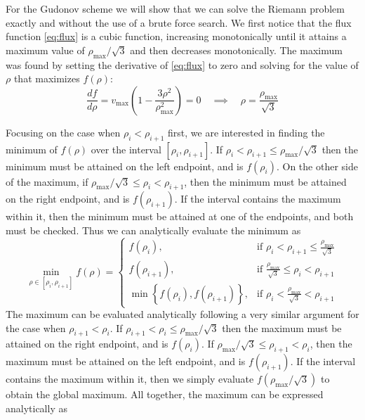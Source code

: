 \documentclass[11pt]{article}
\begin{document}
For the Gudonov scheme we will show that we can solve the Riemann problem exactly and without the use of a brute force search. We first notice that the flux function \eqref{eq:flux} is a cubic function, increasing monotonically until it attains a maximum value of $\rho_\mathrm{max}/\sqrt{3}$ and then decreases monotonically. The maximum was found by setting the derivative of \eqref{eq:flux} to zero and solving for the value of $\rho$ that maximizes $f(\rho)$:
\begin{equation*}
  \frac{df}{d\rho} = v_\mathrm{max} \left( 1 - \frac{3\rho^2}{\rho_\mathrm{max}^2} \right) = 0 \quad \implies \quad \rho = \frac{\rho_\mathrm{max}}{\sqrt{3}}
\end{equation*}

Focusing on the case when $\rho_i < \rho_{i+1}$ first, we are interested in finding the minimum of $f(\rho)$ over the interval $[\rho_i, \rho_{i+1}]$. If $\rho_i < \rho_{i+1} \le \rho_\mathrm{max}/\sqrt{3}$ then the minimum must be attained on the left endpoint, and is $f(\rho_i)$. On the other side of the maximum, if $\rho_\mathrm{max}/\sqrt{3} \le \rho_i < \rho_{i+1}$, then the minimum must be attained on the right endpoint, and is $f(\rho_{i+1})$. If the interval contains the maximum within it, then the minimum must be attained at one of the endpoints, and both must be checked. Thus we can analytically evaluate the minimum as
\begin{equation} \label{eq:min_f}
\min_{\rho \in \left[\rho_i, \rho_{i+1}\right]} f(\rho) =
\begin{cases}
  f(\rho_i),&
    \text{if } \rho_i < \rho_{i+1} \le \frac{\rho_\mathrm{max}}{\sqrt{3}} \\
  f(\rho_{i+1}),&
    \text{if } \frac{\rho_\mathrm{max}}{\sqrt{3}} \le \rho_i < \rho_{i+1} \\
  \min\left\{ f(\rho_i), f(\rho_{i+1}) \right\} ,&
    \text{if } \rho_i < \frac{\rho_\mathrm{max}}{\sqrt{3}} < \rho_{i+1}
\end{cases}
\end{equation}
The maximum can be evaluated analytically following a very similar argument for the case when $\rho_{i+1} < \rho_i$.  If $\rho_{i+1} < \rho_i \le \rho_\mathrm{max}/\sqrt{3}$ then the maximum must be attained on the right endpoint, and is $f(\rho_i)$. If $\rho_\mathrm{max}/\sqrt{3} \le \rho_{i+1} < \rho_i$, then the maximum must be attained on the left endpoint, and is $f(\rho_{i+1})$. If the interval contains the maximum within it, then we simply evaluate $f(\rho_\mathrm{max}/\sqrt{3})$ to obtain the global maximum. All together, the maximum can be expressed analytically as
\end{document}

